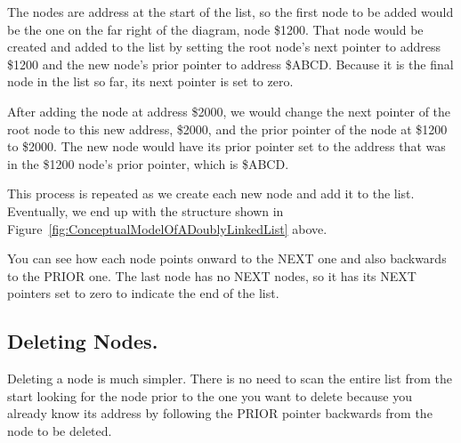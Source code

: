 The nodes are address at the start of the list, so the first node to be added would be the one on the far right of the diagram, node \$1200. That node would be created and added to the list by setting the root node's next pointer to address \$1200 and the new node's prior pointer to address \$ABCD. Because it is the final node in the list so far, its next pointer is set to zero.

After adding the node at address \$2000, we would change the next pointer of the root node to this new address, \$2000, and the prior pointer of the node at \$1200 to \$2000. The new node would have its prior pointer set to the address that was in the \$1200 node's prior pointer, which is \$ABCD.

This process is repeated as we create each new node and add it to the list. Eventually, we end up with the structure shown in Figure~\ref{fig:ConceptualModelOfADoublyLinkedList} above.

You can see how each node points onward to the NEXT one and also
      backwards to the PRIOR one. The last node has no NEXT nodes, so it has
      its NEXT pointers set to zero to indicate the end of the list.

\subsection{Deleting Nodes.}
\label{ch10-dbl-deleteing-nodes}%

Deleting a node is much simpler. There is no need to scan the
      entire list from the start looking for the node prior to the one you
      want to delete because you already know its address by following the
      PRIOR pointer backwards from the node to be deleted.

